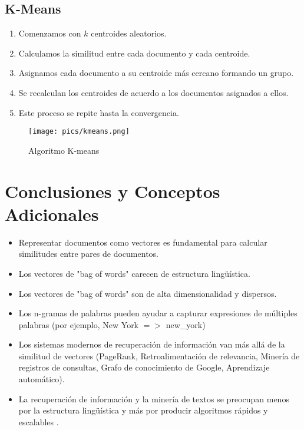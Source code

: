 \subsection{K-Means}
\begin{enumerate}
\item Comenzamos con $k$ centroides aleatorios.
\item Calculamos la similitud entre cada documento y cada centroide.
\item Asignamos cada documento a su centroide más cercano formando un grupo.
\item Se recalculan los centroides de acuerdo a los documentos asignados a ellos.
\item Este proceso se repite hasta la convergencia.
\end{enumerate}

\begin{figure}[h!]
\centering
\texttt{[image: pics/kmeans.png]}
\caption{ Algoritmo K-means}
\end{figure}

\section{Conclusiones y Conceptos Adicionales}
\begin{itemize}
\item Representar documentos como vectores es fundamental para calcular similitudes entre pares de documentos.
\item Los vectores de "bag of words" carecen de estructura lingüística.
\item Los vectores de "bag of words" son de alta dimensionalidad y dispersos.
\item Los n-gramas de palabras pueden ayudar a capturar expresiones de múltiples palabras (por ejemplo, New York $=>$ new\_york)
\item Los sistemas modernos de recuperación de información van más allá de la similitud de vectores (PageRank, Retroalimentación de relevancia, Minería de registros de consultas, Grafo de conocimiento de Google, Aprendizaje automático).
\item La recuperación de información y la minería de textos se preocupan menos por la estructura lingüística y más por producir algoritmos rápidos y escalables \cite{jacobbook}.
\end{itemize}
